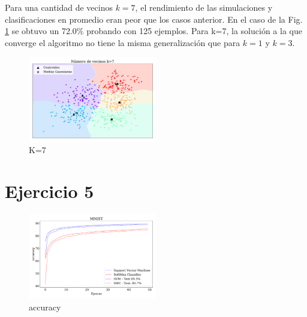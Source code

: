     Para una cantidad de vecinos $k=7$, el rendimiento de las  simulaciones y clasificaciones en promedio eran peor que los casos anterior. En el caso de la Fig.\,\ref{fig:ejer4_k_7} se obtuvo un 72.0\% probando con 125 ejemplos. Para k=7, la solución a la que converge el algoritmo no tiene la misma generalización que para $k=1$ y $k=3$.


\begin{figure}[H]
    \centering
    \includegraphics[width=0.5\textwidth]{plots/ejer_4_K-7_si_converge.pdf}
    \caption{K=7 }
    \label{fig:ejer4_k_7}
\end{figure} 
    

\section*{Ejercicio 5}

\begin{figure}[H]
    \centering
    \includegraphics[width=0.5\textwidth]{plots/ejer_5_MNIST_acc.pdf}
    \caption{accuracy}
    \label{fig:ejer5_mnist_acc}
\end{figure} 





